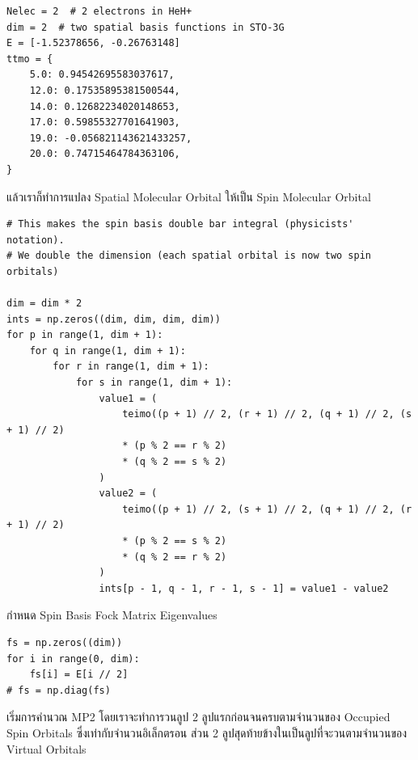 \begin{lstlisting}[style=MyPython]
Nelec = 2  # 2 electrons in HeH+
dim = 2  # two spatial basis functions in STO-3G
E = [-1.52378656, -0.26763148]
ttmo = {
    5.0: 0.94542695583037617,
    12.0: 0.17535895381500544,
    14.0: 0.12682234020148653,
    17.0: 0.59855327701641903,
    19.0: -0.056821143621433257,
    20.0: 0.74715464784363106,
}
\end{lstlisting}

\vspace{5pt}

\noindent แล้วเราก็ทำการแปลง Spatial Molecular Orbital ให้เป็น Spin Molecular Orbital

\vspace{5pt}

\begin{lstlisting}[style=MyPython]
# This makes the spin basis double bar integral (physicists' notation).
# We double the dimension (each spatial orbital is now two spin orbitals)

dim = dim * 2
ints = np.zeros((dim, dim, dim, dim))
for p in range(1, dim + 1):
    for q in range(1, dim + 1):
        for r in range(1, dim + 1):
            for s in range(1, dim + 1):
                value1 = (
                    teimo((p + 1) // 2, (r + 1) // 2, (q + 1) // 2, (s + 1) // 2)
                    * (p % 2 == r % 2)
                    * (q % 2 == s % 2)
                )
                value2 = (
                    teimo((p + 1) // 2, (s + 1) // 2, (q + 1) // 2, (r + 1) // 2)
                    * (p % 2 == s % 2)
                    * (q % 2 == r % 2)
                )
                ints[p - 1, q - 1, r - 1, s - 1] = value1 - value2
\end{lstlisting}

\vspace{5pt}

\noindent กำหนด Spin Basis Fock Matrix Eigenvalues

\vspace{5pt}

\begin{lstlisting}[style=MyPython]
fs = np.zeros((dim))
for i in range(0, dim):
    fs[i] = E[i // 2]
# fs = np.diag(fs)
\end{lstlisting}

\vspace{5pt}

\noindent เริ่มการคำนวณ MP2 โดยเราจะทำการวนลูป 2 ลูปแรกก่อนจนครบตามจำนวนของ Occupied Spin Orbitals ซึ่งเท่ากับจำนวนอิเล็กตรอน
ส่วน 2 ลูปสุดท้ายข้างในเป็นลูปที่จะวนตามจำนวนของ Virtual Orbitals

